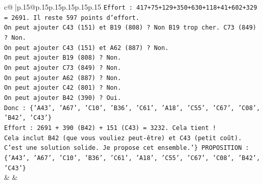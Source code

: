 \documentclass{article}
\begin{document}
{\begin{supertabular}{c@{$\;$}|p{.15\linewidth}@{}p{.15\linewidth}p{.15\linewidth}p{.15\linewidth}p{.15\linewidth}p{.15\linewidth}}
{{{\texttt{Effort : 417+75+129+350+630+118+41+602+329 = 2691. Il reste 597 points d'effort.} \\
\texttt{On peut ajouter C43 (151) et B19 (808) ? Non B19 trop cher. C73 (849) ? Non.} \\
\texttt{On peut ajouter C43 (151) et A62 (887) ? Non.} \\
\texttt{On peut ajouter B19 (808) ? Non.} \\
\texttt{On peut ajouter C73 (849) ? Non.} \\
\texttt{On peut ajouter A62 (887) ? Non.} \\
\texttt{On peut ajouter C42 (801) ? Non.} \\
\texttt{On peut ajouter B42 (390) ? Oui.} \\
\texttt{Donc : \{'A43', 'A67', 'C10', 'B36', 'C61', 'A18', 'C55', 'C67', 'C08', 'B42', 'C43'\}} \\
\texttt{Effort : 2691 + 390 (B42) + 151 (C43) = 3232. Cela tient !} \\
\texttt{Cela inclut B42 (que vous vouliez peut{-}être) et C43 (petit coût).} \\
\texttt{C'est une solution solide. Je propose cet ensemble.'\} PROPOSITION : \{'A43', 'A67', 'C10', 'B36', 'C61', 'A18', 'C55', 'C67', 'C08', 'B42', 'C43'\}} \\
            }
        }
    }
    & & \\ \\


\end{supertabular}}
\end{document}
